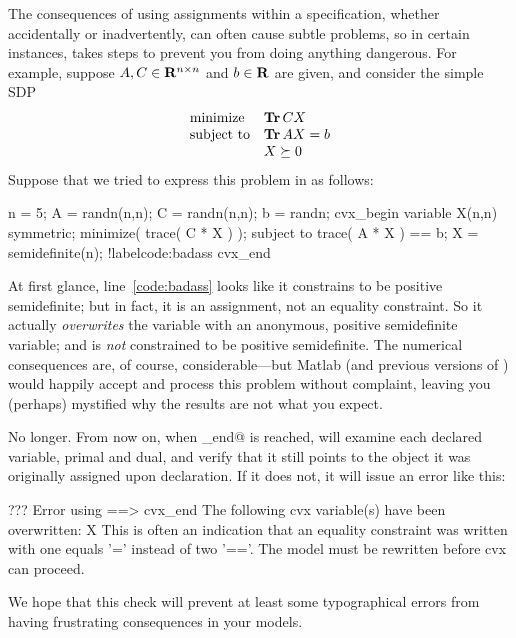 \documentclass[12pt]{article}
\begin{document}
The consequences of using assignments within a \cvx specification, whether
accidentally or inadvertently, can often cause subtle problems, so in certain
instances, \cvx takes steps to prevent you from doing anything dangerous.
For example, suppose $A,C\in\mathbf{R}^{{n}\times{n}}$ and $b\in\R$ are given, and
consider the simple SDP
\begin{equation}
	\begin{array}{ll}
		\text{minimize} & \operatorname{\textbf{Tr}}{CX} \\
		\text{subject to} & \operatorname{\textbf{Tr}}{AX} = b \\
		& X \succeq 0
	\end{array}
\end{equation}	
Suppose that we tried to express this problem in \cvx as follows:
\begin{code2}[firstnumber=1]
	n = 5;
	A = randn(n,n); C = randn(n,n); b = randn;
	cvx_begin
	    variable X(n,n) symmetric;
	    minimize( trace( C * X ) );
	    subject to
	        trace( A * X ) == b;
	        X = semidefinite(n);		!label{code:badass}
	cvx_end
\end{code2}
At first glance, line~\ref{code:badass} looks like it constrains \verb@X@ to be positive
semidefinite; but in fact, it is an assignment, not an equality constraint. So
it actually \emph{overwrites} the
variable \verb@X@ with an anonymous, positive semidefinite variable; and \verb@X@
is \emph{not} constrained to be positive semidefinite. The numerical
consequences are, of course, considerable---but Matlab (and previous versions of \cvx)
would happily accept and process this problem without complaint, leaving you (perhaps)
mystified why the results are not what you expect.

No longer. From now on, when \verb@cvx_end@ is reached, \cvx will examine each 
declared variable, primal and dual, and verify that it still points to the object it was originally
assigned upon declaration. If it does not, 
it will issue an error like this:
\begin{code}
	??? Error using ==> cvx_end
	The following cvx variable(s) have been overwritten:
	   X
	This is often an indication that an equality constraint was
	written with one equals '=' instead of two '=='. The model
	must be rewritten before cvx can proceed.
\end{code}	
We hope that this check will prevent at least some typographical errors from 
having frustrating consequences in your models.
\end{document}
